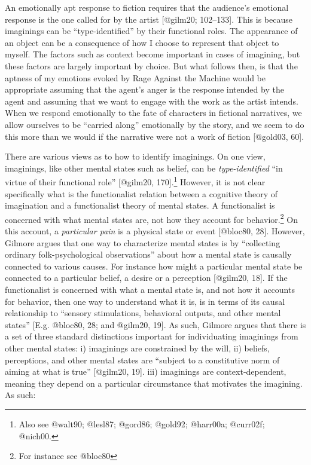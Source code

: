 \documentclass[
  letterpaper,
  DIV=11,
  numbers=noendperiod]{scrartcl}
\theoremstyle{remark}
\begin{document}
An emotionally apt response to fiction requires that the audience's
emotional response is the one called for by the artist {[}@gilm20;
102--133{]}. This is because imaginings can be ``type-identified'' by
their functional roles. The appearance of an object can be a consequence
of how I choose to represent that object to myself. The factors such as
context become important in cases of imagining, but these factors are
largely important by choice. But what follows then, is that the aptness
of my emotions evoked by Rage Against the Machine would be appropriate
assuming that the agent's anger is the response intended by the agent
and assuming that we want to engage with the work as the artist intends.
When we respond emotionally to the fate of characters in fictional
narratives, we allow ourselves to be ``carried along'' emotionally by
the story, and we seem to do this more than we would if the narrative
were not a work of fiction {[}@gold03, 60{]}.

There are various views as to how to identify imaginings. On one view,
imaginings, like other mental states such as belief, can be
\emph{type-identified} ``in virtue of their functional role''
{[}@gilm20, 170{]}.\footnote{Also see @walt90; @lesl87; @gord86;
  @gold92; @harr00a; @curr02f; @nich00.} However, it is not clear
specifically what is the functionalist relation between a cognitive
theory of imagination and a functionalist theory of mental states. A
functionalist is concerned with what mental states are, not how they
account for behavior.\footnote{For instance see @bloc80} On this
account, a \emph{particular pain} is a physical state or event
{[}@bloc80, 28{]}. However, Gilmore argues that one way to characterize
mental states is by ``collecting ordinary folk-psychological
observations'' about how a mental state is causally connected to various
causes. For instance how might a particular mental state be connected to
a particular belief, a desire or a perception {[}@gilm20, 18{]}. If the
functionalist is concerned with what a mental state is, and not how it
accounts for behavior, then one way to understand what it is, is in
terms of its causal relationship to ``sensory stimulations, behavioral
outputs, and other mental states'' {[}E.g. @bloc80, 28; and @gilm20,
19{]}. As such, Gilmore argues that there is a set of three standard
distinctions important for individuating imaginings from other mental
states: i) imaginings are constrained by the will, ii) beliefs,
perceptions, and other mental states are ``subject to a constitutive
norm of aiming at what is true'' {[}@gilm20, 19{]}. iii) imaginings are
context-dependent, meaning they depend on a particular circumstance that
motivates the imagining. As such:
\end{document}
